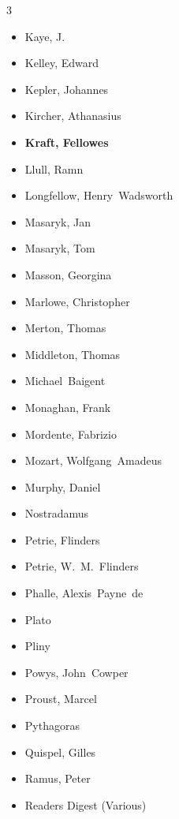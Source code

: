 \documentclass[10pt,makeidx]{extreport}
\begin{document}
\begin{multicols}{3}
\begin{itemize}
		\item Kaye, J.
		\item Kelley, Edward
		\item Kepler, Johannes
		\item Kircher, Athanasius
		\item \textbf{Kraft, Fellowes}
		\item Llull, Ramn
		\item Longfellow, Henry~Wadsworth
		\item Masaryk, Jan
		\item Masaryk, Tom
		\item Masson, Georgina
		\item Marlowe, Christopher
		\item Merton, Thomas
		\item Middleton, Thomas
		\item Michael~Baigent
		\item Monaghan, Frank
		\item Mordente, Fabrizio
		\item Mozart, Wolfgang~Amadeus
		\item Murphy, Daniel
		\item Nostradamus
		\item Petrie, Flinders
		\item Petrie, W.~M.~Flinders
		\item Phalle, Alexis~Payne~de
		\item Plato
		\item Pliny
		\item Powys, John~Cowper
		\item Proust, Marcel
		\item Pythagoras
		\item Quispel, Gilles
		\item Ramus, Peter
		\item Readers Digest (Various)

\end{itemize}
\end{multicols}
\end{document}
